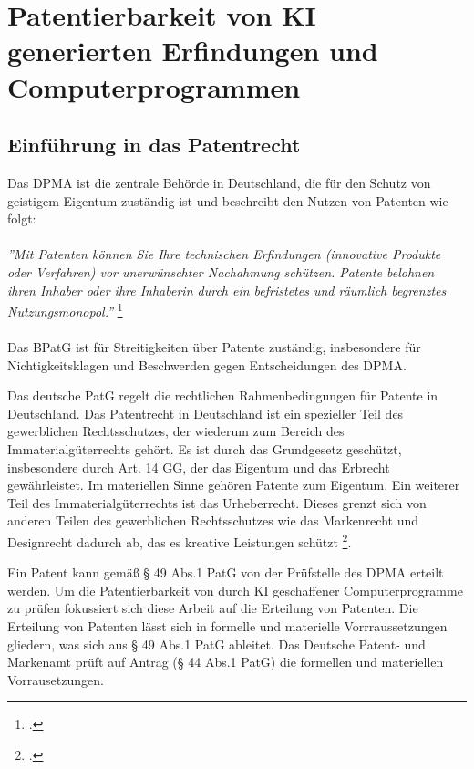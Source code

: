 \chapter{Patentierbarkeit von KI generierten Erfindungen und Computerprogrammen \label{cha:chapter3}}


\section{Einführung in das Patentrecht\label{sec:Patentrecht}}


Das \gls{DPMA} ist die zentrale Behörde in Deutschland, 
die für den Schutz von geistigem Eigentum zuständig ist und 
beschreibt den Nutzen von Patenten wie folgt:
\\
\\
\textit{''Mit Patenten können Sie Ihre technischen Erfindungen 
(innovative Produkte oder Verfahren) vor unerwünschter Nachahmung schützen. 
Patente belohnen ihren Inhaber 
oder ihre Inhaberin durch ein befristetes und räumlich begrenztes Nutzungsmonopol.''} 
\footcite{DPMAPatentschutz}
\\
\\
Das \gls{BPatG} ist für Streitigkeiten über Patente zuständig, 
insbesondere für Nichtigkeitsklagen und Beschwerden gegen Entscheidungen des DPMA.

Das deutsche PatG
regelt die rechtlichen Rahmenbedingungen für Patente in Deutschland.
Das Patentrecht in Deutschland ist ein spezieller Teil des gewerblichen Rechtsschutzes, 
der wiederum zum Bereich des Immaterialgüterrechts gehört. 
Es ist durch das Grundgesetz geschützt, insbesondere durch Art. 14 GG, 
der das Eigentum und das Erbrecht gewährleistet. 
Im materiellen Sinne gehören Patente zum Eigentum.
Ein weiterer Teil des Immaterialgüterrechts ist das Urheberrecht. 
Dieses grenzt sich von anderen Teilen des
gewerblichen Rechtsschutzes wie das Markenrecht und Designrecht dadurch ab, das 
es kreative Leistungen schützt \footcite{GewerblicherRechtschutzUnd}. 


Ein Patent kann gemäß § 49 Abs.1 PatG von der Prüfstelle des DPMA erteilt werden. 
Um die Patentierbarkeit von durch KI geschaffener Computerprogramme 
zu prüfen fokussiert sich diese Arbeit auf die Erteilung von Patenten. 
Die Erteilung von Patenten lässt sich in formelle und materielle Vorrraussetzungen 
gliedern, was sich aus § 49 Abs.1 PatG ableitet. 
Das Deutsche Patent- und Markenamt prüft auf Antrag (§ 44 Abs.1 PatG) 
die formellen und materiellen Vorrausetzungen.

